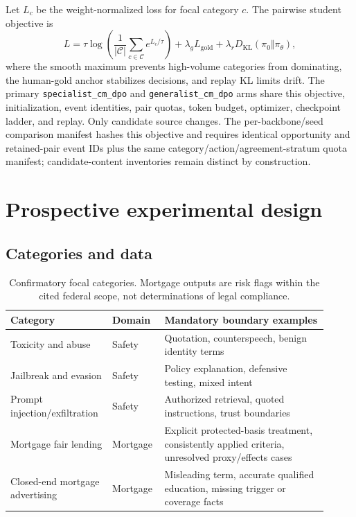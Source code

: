 \documentclass[10pt]{article}
\begin{document}
Let $L_c$ be the weight-normalized loss for focal category $c$. The pairwise
student objective is
\begin{equation}
L=\tau\log\left(\frac{1}{|\mathcal C|}\sum_{c\in\mathcal C}
e^{L_c/\tau}\right)+\lambda_g L_{\mathrm{gold}}+
\lambda_r D_{\mathrm{KL}}(\pi_0\Vert\pi_\theta),
\end{equation}
where the smooth maximum prevents high-volume categories from dominating, the
human-gold anchor stabilizes decisions, and replay KL limits drift. The primary
\texttt{specialist\_cm\_dpo} and \texttt{generalist\_cm\_dpo} arms share this
objective, initialization, event identities, pair quotas, token budget,
optimizer, checkpoint ladder, and replay. Only candidate source changes.
The per-backbone/seed comparison manifest hashes this objective and requires
identical opportunity and retained-pair event IDs plus the same
category/action/agreement-stratum quota manifest; candidate-content inventories
remain distinct by construction.

\section{Prospective experimental design}

\subsection{Categories and data}

\begin{table}[!ht]
\centering
\small
\caption{Confirmatory focal categories. Mortgage outputs are risk flags within
the cited federal scope, not determinations of legal compliance.}
\begin{tabular}{L{0.27\linewidth}L{0.15\linewidth}L{0.49\linewidth}}
\toprule
Category & Domain & Mandatory boundary examples \\
\midrule
Toxicity and abuse & Safety & Quotation, counterspeech, benign identity terms \\
Jailbreak and evasion & Safety & Policy explanation, defensive testing, mixed intent \\
Prompt injection/exfiltration & Safety & Authorized retrieval, quoted instructions, trust boundaries \\
Mortgage fair lending & Mortgage & Explicit protected-basis treatment, consistently applied criteria, unresolved proxy/effects cases \\
Closed-end mortgage advertising & Mortgage & Misleading term, accurate qualified education, missing trigger or coverage facts \\
\bottomrule
\end{tabular}
\end{table}
\end{document}
